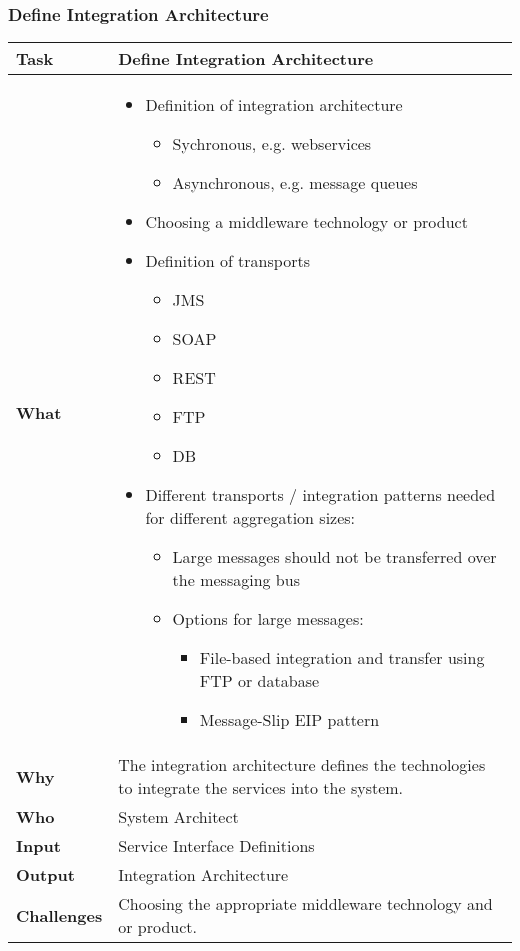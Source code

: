 \subsubsection{Define Integration Architecture}
\begin{minipage}{\textwidth}
 \label{table:ch6_Task_Define_Integration_Architecture}
\begin{tabular}
	{|m{3cm}|m{10cm}|} \hline \bfseries Task & Define Integration Architecture\\
	\hline \bfseries What &
	\begin{itemize}
		\item Definition of integration architecture
		\begin{itemize}
			\item Sychronous, e.g. webservices
			\item Asynchronous, e.g. message queues
		\end{itemize}
		\item Choosing a middleware technology or product
		\item Definition of transports
		\begin{itemize}
			\item JMS
			\item SOAP
			\item REST
			\item FTP
			\item DB
		\end{itemize}
		\item Different transports / integration patterns needed for different aggregation sizes:
		\begin{itemize}
			\item Large messages should not be transferred over the messaging bus
			\item Options for large messages:
			\begin{itemize}
				\item File-based integration and transfer using FTP or database
				\item Message-Slip EIP pattern
			\end{itemize}
		\end{itemize}
	\end{itemize}
	\\
	\hline \bfseries Why & The integration architecture defines the technologies to integrate the services into the system.\\
	\hline \bfseries Who & System Architect\\
	\hline \bfseries Input & Service Interface Definitions
	\\
	\hline \bfseries Output & Integration Architecture\\
	\hline \bfseries Challenges & Choosing the appropriate middleware technology and or product.\\
	\hline 
\end{tabular}
\end{minipage}

